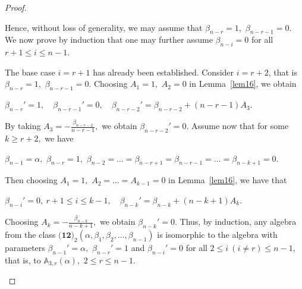 \documentclass{jonasart}
\begin{document}
\begin{proof}
\begin{enumerate}
			Hence, without loss of generality, we may assume that $\beta_{n-r}=1,$ $\beta_{n-r-1}=0.$
			We now prove by induction that one may further assume $\beta_{n-i} = 0$ for all $r+1 \le i \le n-1$.

			The base case $i=r+1$ has already been established. Consider $i=r+2$, that is $\beta_{n-r}=1,$ $\beta_{n-r-1}=0.$ Choosing $A_1 = 1,$ $A_2 = 0$ in Lemma~\ref{lem16}, we obtain
			\begin{center}
				$\beta_{n-r}'=1, \quad \beta_{n-r-1}'=0, \quad \beta_{n-r-2}'=\beta_{n-r-2} +(n-r-1) A_{3}.$
			\end{center}
			By taking $A_3 =-\frac{\beta_{n-r-2}}{n-r-1},$ we obtain $\beta_{n-r-2}'=0.$
			Assume now that for some $k \ge r+2,$ we have
			\begin{center}
				$\beta_{n-1} = \alpha,$ $\beta_{n-r} =1,$ $\beta_{n-2}= \dots= \beta_{n-r+1} = \beta_{n-r-1}= \dots =\beta_{n-k+1}=0.$
			\end{center}
			Then choosing
			$A_1 =1,$ $A_2 =\dots=A_{k-1}=0$
			in Lemma~\ref{lem16}, we have that
			\begin{center}
				$\beta_{n-i}'=0, \ r+1 \leq i \leq k-1, \quad \beta_{n-k}'=\beta_{n-k} +(n-k+1) A_k.$
			\end{center}
			Choosing $A_k =-\frac{\beta_{n-k}}{n-k+1},$ we obtain $\beta_{n-k}'=0.$
			Thus, by induction, any algebra from the class $\textbf{(12)}_2 (\alpha, \beta_{1},\beta_{2},\dots,\beta_{n-1})$ is isomorphic to the algebra with parameters $\beta_{n-1}'= \alpha,$ $\beta_{n-r}' = 1$ and $\beta_{n-i}' = 0$ for all $2 \le i \ (i \neq r) \le n-1$, that is, to $\mathbb{A}_{3,r}(\alpha),$ $2\leq r\leq n-1.$
		\end{enumerate}
	\end{proof}
\end{document}
